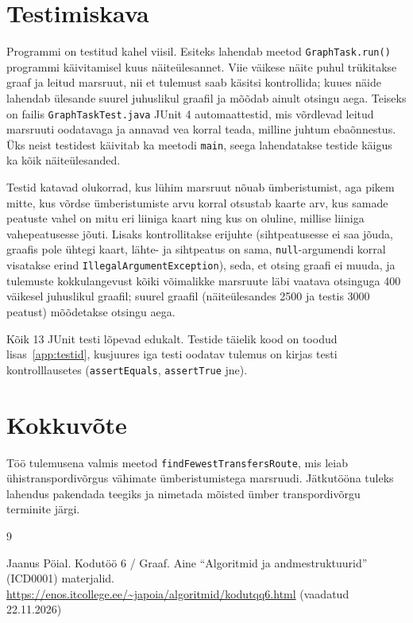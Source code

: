 \documentclass[12pt,a4paper,oneside]{report}
\newcommand{\code}[1]{\texttt{#1}}
\theoremstyle{definition}
\theoremstyle{plain}
\begin{document}
\chapter{Testimiskava}
\label{ch:testid}

Programmi on testitud kahel viisil. Esiteks lahendab meetod
\code{GraphTask.run()} programmi käivitamisel kuus näiteülesannet. Viie
väikese näite puhul trükitakse graaf ja leitud marsruut, nii et tulemust
saab käsitsi kontrollida; kuues näide lahendab ülesande suurel juhuslikul
graafil ja mõõdab ainult otsingu aega. Teiseks on failis
\code{GraphTaskTest.java} JUnit 4 automaattestid, mis võrdlevad leitud
marsruuti oodatavaga ja annavad vea korral teada, milline juhtum
ebaõnnestus. Üks neist testidest käivitab ka meetodi \code{main}, seega
lahendatakse testide käigus ka kõik näiteülesanded.

Testid katavad olukorrad, kus lühim marsruut nõuab ümberistumist, aga
pikem mitte, kus võrdse ümberistumiste arvu korral otsustab kaarte arv,
kus samade peatuste vahel on mitu eri liiniga kaart ning kus on oluline,
millise liiniga vahepeatusesse jõuti. Lisaks kontrollitakse erijuhte
(sihtpeatusesse ei saa jõuda, graafis pole ühtegi kaart, lähte- ja
sihtpeatus on sama, \code{null}-argumendi korral visatakse erind
\code{IllegalArgumentException}), seda, et otsing graafi ei muuda, ja
tulemuste kokkulangevust kõiki võimalikke marsruute läbi vaatava otsinguga
400 väikesel juhuslikul graafil; suurel graafil (näiteülesandes 2500 ja
testis 3000 peatust) mõõdetakse otsingu aega.

Kõik 13 JUnit testi lõpevad edukalt. Testide täielik kood on toodud
lisas~\ref{app:testid}, kusjuures iga testi oodatav tulemus on kirjas
testi kontrolllausetes (\code{assertEquals}, \code{assertTrue} jne).

\chapter*{Kokkuvõte}
Töö tulemusena valmis meetod \code{findFewestTransfersRoute}, mis leiab
ühistranspordivõrgus vähimate ümberistumistega marsruudi. Jätkutööna tuleks
lahendus pakendada teegiks ja nimetada mõisted ümber transpordivõrgu
terminite järgi.

\clearpage
\begin{thebibliography}{9}

Jaanus Pöial. Kodutöö 6 / Graaf. Aine ``Algoritmid ja andmestruktuurid''
(ICD0001) materjalid.
\url{https://enos.itcollege.ee/~japoia/algoritmid/kodutqq6.html}
(vaadatud 22.11.2026)

\end{thebibliography}
\end{document}

